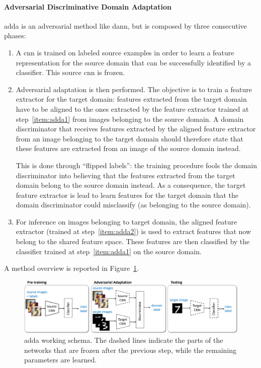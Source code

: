 \documentclass[%
    corpo=12pt,
    twoside,
    stile=classica,   
    tipotesi=magistrale,
    evenboxes,
    english,
	numerazioneromana,
]{toptesi}
\begin{document}
\paragraph{Adversarial Discriminative Domain Adaptation}\label{sec:adda}
\gls{adda}\cite{tzeng2017adversarial} is an adversarial method like \gls{dann}, but is composed by three consecutive phases:
\begin{enumerate}
	\item \label{item:adda1} A \gls{cnn} is trained on labeled source examples in order to learn a feature representation for the source domain that can be successfully identified by a classifier. This source \gls{cnn} is frozen.
	
	\item \label{item:adda2} Adversarial adaptation is then performed.
	The objective is to train a feature extractor for the target domain: features extracted from the target domain have to be aligned to the ones extracted by the feature extractor trained at step~\ref{item:adda1} from images belonging to the source domain. A domain discriminator that receives features extracted by the aligned feature extractor from an image belonging to the target domain should therefore state that these features are extracted from an image of the source domain instead.
	
	This is done through \textquotedblleft flipped labels\textquotedblright : the training procedure fools the domain discriminator into believing that the features extracted from the target domain belong to the source domain instead. As a consequence, the target feature extractor is lead to learn features for the target domain that the domain discriminator could misclassify (as belonging to the source domain).
	
	\item For inference on images belonging to target domain, the aligned feature extractor (trained at step~\ref{item:adda2}) is used to extract features that now belong to the shared feature space. These features are then classified by the classifier trained at step~\ref{item:adda1} on the source domain.
\end{enumerate}
A method overview is reported in Figure~\ref{fig:adda}.

\begin{figure}[ht]
	\centering
	\includegraphics[width=\linewidth]{imgs/adda.png}
	\caption[\acrshort{adda} working schema]{\acrshort{adda} working schema\cite{tzeng2017adversarial}. The dashed lines indicate the parts of the networks that are frozen after the previous step, while the remaining parameters are learned.}
	\label{fig:adda}
\end{figure}
\end{document}
